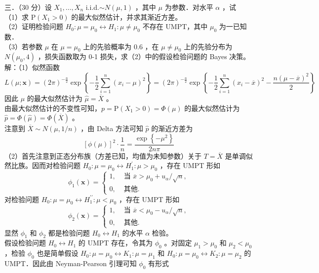 \documentclass[UTF8,openany]{book}
\begin{document}
	
	\noindent 三．（30 分）设 $X_1, \ldots, X_n$ i.i.d.$\sim N(\mu, 1)$ ，其中 $\mu$ 为参数．对水平 $\alpha$ ，试\\
	（1）求 $\mathrm{P}\left(X_1>0\right)$ 的最大似然估计，并求其渐近方差。\\
	（2）证明检验问题 $H_0: \mu=\mu_0 \leftrightarrow H_1: \mu \neq \mu_0$ 不存在 UMPT，其中 $\mu_0$ 为一已知数．\\
	（3）若参数 $\mu$ 在 $\mu=\mu_0$ 上的先验概率为 0.6 ，在 $\mu \neq \mu_0$ 上的先验分布为 $N\left(\mu_0, 4\right)$ ，损失函数取为 0-1 损失，求（2）中的假设检验问题的 Bayes 决策。\\
	解：（1）似然函数
	$$
	L(\mu ; \boldsymbol{x})=(2 \pi)^{-\frac{n}{2}} \exp \left\{-\frac{1}{2} \sum_{i=1}^n\left(x_i-\mu\right)^2\right\}=(2 \pi)^{-\frac{n}{2}} \exp \left\{-\frac{1}{2} \sum_{i=1}^n\left(x_i-\overline{x}\right)^2-\frac{n(\mu-\overline{x})^2}{2}\right\}
	$$
	因此 $\mu$ 的最大似然估计为 $\hat{\mu}=\overline{X}$ 。\\
	由最大似然估计的不变性可知，$p=\mathrm{P}\left(X_1>0\right)=\Phi(\mu)$ 的最大似然估计为 $\hat{p}=\Phi(\hat{\mu})=\Phi(\overline{X})$ 。\\
	注意到 $\overline{X} \sim N(\mu, 1 / n)$ ，由 Delta 方法可知 $\hat{p}$ 的渐近方差为
	$$
	[\phi(\mu)]^2 \cdot \frac{1}{n}=\frac{\exp \left\{-\mu^2\right\}}{2 n \pi}
	$$
	（2）首先注意到正态分布族（方差已知，均值为未知参数）关于 $T=\overline{X}$ 是单调似然比族。因而对检验问题 $H_0: \mu=\mu_0 \leftrightarrow H_1^{\prime}: \mu>\mu_0$ ，存在 UMPT 形如
	$$
	\phi_1(\boldsymbol{x})= \begin{cases}1, & \text { 当 } \overline{x}>\mu_0+u_\alpha / \sqrt{n}, \\ 0, & \text { 其他. }\end{cases}
	$$
	对检验问题 $H_0: \mu=\mu_0 \leftrightarrow H_1^{\prime \prime}: \mu<\mu_0$ ，存在 UMPT 形如
	$$
	\phi_2(\boldsymbol{x})= \begin{cases}1, & \text { 当 } \overline{x}<\mu_0-u_\alpha / \sqrt{n}, \\ 0, & \text { 其他. }\end{cases}
	$$
	显然 $\phi_1$ 和 $\phi_2$ 都是检验问题 $H_0 \leftrightarrow H_1$ 的水平 $\alpha$ 检验。\\
	假设检验问题 $H_0 \leftrightarrow H_1$ 的 UMPT 存在，令其为 $\phi_0$ 。对固定 $\mu_1>\mu_0$ 和 $\mu_2<\mu_0$ ，检验 $\phi_0$ 也是简单假设 $H_0: \mu=\mu_0 \leftrightarrow K_1: \mu=\mu_1$ 和 $H_0: \mu=\mu_0 \leftrightarrow K_2: \mu=\mu_2$ 的UMPT．因此由 Neyman-Pearson 引理可知 $\phi_0$ 有形式
\end{document}
